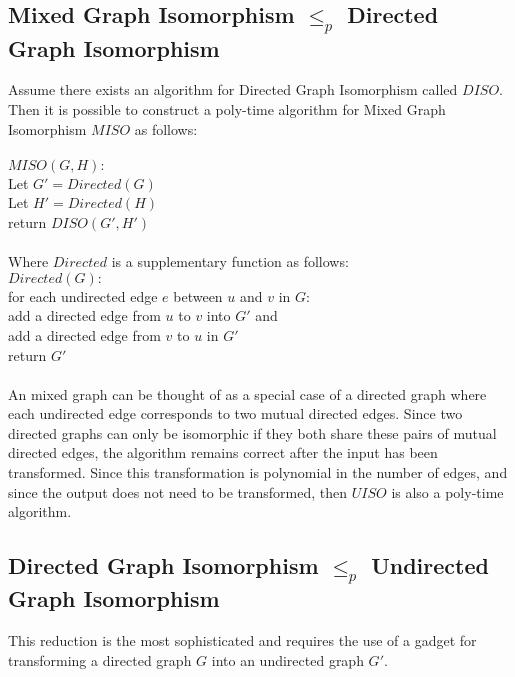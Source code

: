 \documentclass[letterpaper,notitlepage,twoside]{article}
\newcommand\tab[1][1cm]{\hspace*{#1}} %
\begin{document}
\subsection*{Mixed Graph Isomorphism $\leq_p$ Directed Graph Isomorphism}
Assume there exists an algorithm for Directed Graph Isomorphism called $DISO$. Then it is possible to construct a poly-time algorithm for Mixed Graph Isomorphism $MISO$ as follows:
\\\\
$MISO(G, H):$\\
\tab Let $G' = Directed(G)$\\
\tab Let $H' = Directed(H)$\\
\tab return $DISO(G', H')$
\\\\
Where $Directed$ is a supplementary function as follows:\\
$Directed(G):$\\
\tab for each undirected edge $e$ between $u$ and $v$ in $G$:\\
\tab\tab add a directed edge from $u$ to $v$ into $G'$ and\\
\tab\tab add a directed edge from $v$ to $u$ in $G'$\\
\tab return $G'$
\\\\
An mixed graph can be thought of as a special case of a directed graph where each undirected edge corresponds to two mutual directed edges. Since two directed graphs can only be isomorphic if they both share these pairs of mutual directed edges, the algorithm remains correct after the input has been transformed. Since this transformation is polynomial in the number of edges, and since the output does not need to be transformed, then $UISO$ is also a poly-time algorithm.

\subsection*{Directed Graph Isomorphism $\leq_p$ Undirected Graph Isomorphism}
This reduction is the most sophisticated and requires the use of a gadget for transforming a directed graph $G$ into an undirected graph $G'$.
\end{document}
